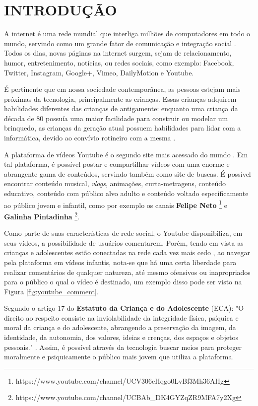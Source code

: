 \newpage
\section{INTRODUÇÃO}


A internet é uma rede mundial que interliga milhões de computadores em todo o mundo, servindo como um grande fator de comunicação e integração social \cite{marioFalcao2015}. Todos os dias, novas páginas na internet surgem, sejam de relacionamento, humor, entretenimento, notícias, ou redes sociais, como exemplo: Facebook, Twitter, Instagram, Google+, Vimeo, DailyMotion e Youtube.

É pertinente que em nossa sociedade contemporânea, as pessoas estejam mais próximas da tecnologia, principalmente as crianças. 
Essas crianças adquirem habilidades diferentes das crianças de antigamente: enquanto uma criança da década de 80 possuía uma maior facilidade para construir ou modelar um brinquedo, as crianças da geração atual possuem habilidades para lidar com a informática, devido ao convívio rotineiro com a mesma \cite{marioFalcao2016}.

A plataforma de vídeos Youtube é o segundo site mais acessado do mundo \cite{alexaYoutube}. Em tal plataforma, é possível postar e compartilhar vídeos com uma enorme e abrangente gama de conteúdos, servindo também como site de buscas. É possível encontrar conteúdo musical, \textit{vlogs}, animações, curta-metragens, conteúdo educativo, conteúdo com público alvo adulto e conteúdo voltado especificamente ao público jovem e infantil, como por exemplo os canais \textbf{Felipe Neto} \footnote{https://www.youtube.com/channel/UCV306eHqgo0LvBf3Mh36AHg} e \textbf{Galinha Pintadinha} \footnote{https://www.youtube.com/channel/UCBAb\_DK4GYZqZR9MFA7y2Xg}.

Como parte de suas características de rede social, o Youtube disponibiliza, em seus vídeos, a possibilidade de usuários comentarem. Porém, tendo em vista as crianças e adolescentes estão conectadas na rede cada vez mais cedo \cite{EnyoGoncalves2017}, ao navegar pela plataforma em vídeos infantis, nota-se que há uma certa liberdade para realizar comentários de qualquer natureza, até mesmo ofensivos ou inapropriados para o público o qual o vídeo é destinado, um exemplo disso pode ser visto na Figura \ref{fig:youtube_comment}.

Segundo o artigo 17 do \textbf{Estatuto da Criança e do Adolescente} (ECA): "O direito ao respeito consiste na inviolabilidade da integridade física, psíquica e moral da criança e do adolescente, abrangendo a preservação da imagem, da identidade, da autonomia, dos valores, ideias e crenças, dos espaços e objetos pessoais." \cite{eca_lei}.  Assim, é possível através da tecnologia buscar meios para proteger moralmente e psiquicamente o público mais jovem que utiliza a plataforma. 

